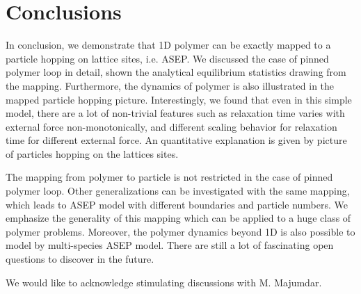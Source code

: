 \documentclass[aps,showpacs,twocolumn,floatfix,prx,superscriptaddress]{revtex4-1}
\begin{document}
\section{Conclusions}
In conclusion, we demonstrate that 1D polymer can be exactly mapped to a
particle hopping on lattice sites, i.e. ASEP.  We discussed the case of pinned
polymer loop in detail, shown the analytical equilibrium statistics drawing
from the mapping. Furthermore, the dynamics of polymer is also illustrated
in the mapped particle hopping picture. Interestingly, we found that even in
this simple model, there are a lot of non-trivial features such as relaxation
time varies with external force non-monotonically, and different scaling
behavior for relaxation time for different external force. An quantitative
explanation is given by picture of particles hopping on the lattices sites.  

The mapping from polymer to particle is not restricted in the case of pinned
polymer loop. Other generalizations can be investigated with the same mapping,
which leads to ASEP model with different boundaries and particle numbers. We
emphasize the generality of this mapping which can be applied to a huge class of
polymer problems. Moreover, the polymer dynamics beyond 1D is also possible to
model by multi-species ASEP model. There are still a lot of fascinating open
questions to discover in the future.

\begin{acknowledgments}
We would like to acknowledge stimulating discussions with M. Majumdar.
\end{acknowledgments}


%  
% 
\end{document}
